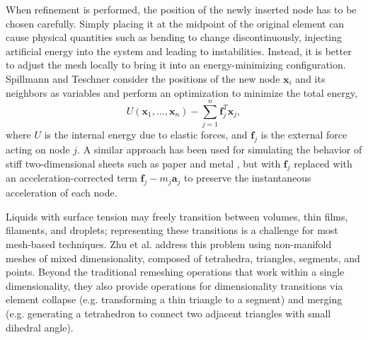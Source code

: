 When refinement is performed, the position of the newly inserted node has to be chosen carefully.
Simply placing it at the midpoint of the original element can cause physical quantities such as bending to change discontinuously, injecting artificial energy into the system and leading to instabilities.
Instead, it is better to adjust the mesh locally to bring it into an energy-minimizing configuration.
Spillmann and Teschner \cite{Spillmann2008} consider the positions of the new node $\mathbf x_i$ and its neighbors as variables and perform an optimization to minimize the total energy,
\begin{equation}
	U(\mathbf x_1,\ldots,\mathbf x_n) - \sum_{j=1}^n\mathbf f_j^T\mathbf x_j,
\end{equation}
where $U$ is the internal energy due to elastic forces, and $\mathbf f_j$ is the external force acting on node $j$.
A similar approach has been used for simulating the behavior of stiff two-dimensional sheets such as paper and metal \cite{Narain2013,Pfaff2014}, but with $\mathbf f_j$ replaced with an acceleration-corrected term $\mathbf f_j - m_j\mathbf a_j$ to preserve the instantaneous acceleration of each node.

Liquids with surface tension may freely transition between volumes, thin films, filaments, and droplets; representing these transitions is a challenge for most mesh-based techniques.
Zhu et al. \cite{Zhu2014} address this problem using non-manifold meshes of mixed dimensionality, composed of tetrahedra, triangles, segments, and points.
Beyond the traditional remeshing operations that work within a single dimensionality, they also provide operations for dimensionality transitions via element collapse (e.g. transforming a thin triangle to a segment) and merging (e.g. generating a tetrahedron to connect two adjacent triangles with small dihedral angle).

